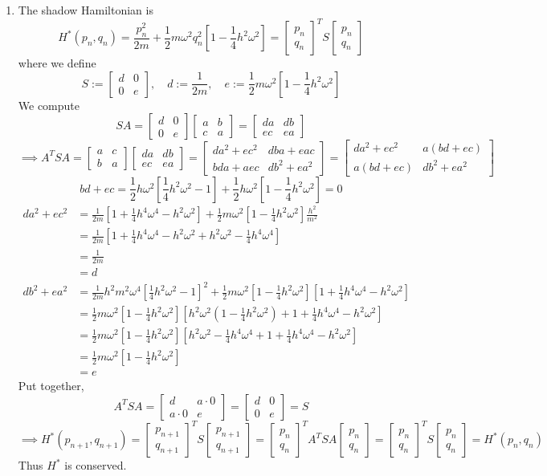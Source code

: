 \documentclass{article}
\newcommand{\br}[1]{\left(#1\right)}
\newcommand{\sbr}[1]{\left[#1\right]}
\newcommand{\m}[2][b]{\begin{#1matrix}#2\end{#1matrix}}
\newcommand{\imp}{\implies}
\newcommand{\om}{\omega}
\begin{document}
\begin{enumerate}
\begin{enumerate}
	
	\item The shadow Hamiltonian is
	$$H^*(p_n,q_n) = \frac{p_n^2}{2m} + \frac12m\om^2q_n^2\sbr{1 - \frac14h^2\om^2}
	= \m{p_n \\ q_n}^T S \m{p_n \\ q_n}$$
	where we define
	$$S := \m{d & 0 \\ 0 & e},
	\quad d := \frac1{2m},
	\quad e := \frac12m\om^2\sbr{1 - \frac14h^2\om^2}$$
	We compute
	$$SA = \m{d & 0 \\ 0 & e}\m{a & b \\ c & a}
	= \m{da & db \\ ec & ea}$$
	$$\imp A^TSA = \m{a & c \\ b & a}\m{da & db \\ ec & ea}
	= \m{da^2+ec^2 & dba+eac \\ bda+aec & db^2+ea^2}
	= \m{da^2+ec^2 & a(bd+ec) \\ a(bd+ec) & db^2+ea^2}$$
	$$bd + ec = \frac12h\om^2\sbr{\frac14h^2\om^2 - 1} + \frac12h\om^2\sbr{1 - \frac14h^2\om^2} = 0$$
	\begin{align*}
		da^2 + ec^2 &= \frac{1}{2m}\sbr{1 + \frac14h^4\om^4 - h^2\om^2} + \frac12m\om^2\sbr{1 - \frac14h^2\om^2}\frac{h^2}{m^2}\\
		&= \frac{1}{2m}\sbr{1 + \frac14h^4\om^4 - h^2\om^2 + h^2\om^2 - \frac14h^4\om^4}\\
		&= \frac{1}{2m}\\
		&= d\\		
		db^2 + ea^2 &= \frac{1}{2m}h^2m^2\om^4\sbr{\frac14h^2\om^2 - 1}^2 + \frac12m\om^2\sbr{1 - \frac14h^2\om^2}\sbr{1 + \frac14h^4\om^4 - h^2\om^2} \\
		&= \frac12m\om^2\sbr{1-\frac14h^2\om^2}\sbr{h^2\om^2\br{1 - \frac14h^2\om^2} + 1 + \frac14h^4\om^4 - h^2\om^2}\\
		&= \frac12m\om^2\sbr{1-\frac14h^2\om^2}\sbr{h^2\om^2 - \frac14h^4\om^4 + 1 + \frac14h^4\om^4 - h^2\om^2}\\
		&= \frac12m\om^2\sbr{1-\frac14h^2\om^2}\\
		&= e	
	\end{align*}
	Put together,
	$$A^TSA = \m{d & a\cdot0 \\ a\cdot0 & e} = \m{d & 0 \\ 0 & e} = S$$
	$$\imp H^*(p_{n+1},q_{n+1}) = \m{p_{n+1} \\ q_{n+1}}^TS\m{p_{n+1} \\ q_{n+1}}
	= \m{p_{n} \\ q_{n}}^TA^TSA\m{p_{n} \\ q_{n}}
	= \m{p_{n} \\ q_{n}}^TS\m{p_{n} \\ q_{n}}
	= H^*(p_n,q_n)$$
	Thus $H^*$ is conserved.
	

\end{enumerate}
\end{enumerate}
\end{document}
